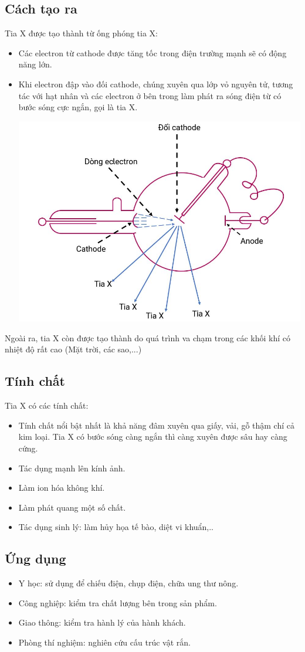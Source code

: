 \subsection {Cách tạo ra}
Tia X được tạo thành từ ống phóng tia X:
\begin{itemize}
\item Các electron từ cathode được tăng tốc trong điện trường mạnh sẽ có động năng lớn.
\item Khi electron đập vào đối cathode, chúng xuyên qua lớp vỏ nguyên tử, tương tác với hạt nhân và các electron ở bên trong làm phát ra sóng điện từ có bước sóng cực ngắn, gọi là tia X.

\begin{center}
	\includegraphics[scale=0.5]{../figs/VN12-PH-36-L-021-5-1.JPG}
\end{center}
\end{itemize}
Ngoài ra, tia X còn được tạo thành do quá trình va chạm trong các khối khí có nhiệt độ rất cao (Mặt trời, các sao,...)
\subsection{Tính chất}

Tia X có các tính chất:

\begin{itemize}
	\item Tính chất nổi bật nhất là khả năng đâm xuyên qua giấy, vải, gỗ thậm chí cả kim loại. Tia X có bước sóng càng ngắn thì càng xuyên được sâu hay càng cứng.
	\item Tác dụng mạnh lên kính ảnh.
	\item Làm ion hóa không khí. 
	\item Làm phát quang một số chất.
	\item Tác dụng sinh lý: làm hủy họa tế bào, diệt vi khuẩn,..
	
\end{itemize}

\subsection{Ứng dụng}

\begin{itemize}
	\item Y học: sử dụng để chiếu điện, chụp điện, chữa ung thư nông.
	\item Công nghiệp: kiểm tra chất lượng bên trong sản phẩm.
	\item Giao thông: kiểm tra hành lý của hành khách.
	\item Phòng thí nghiệm: nghiên cứu cấu trúc vật rắn.
\end{itemize}
